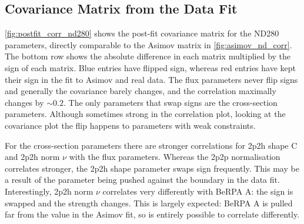 \subsection{Covariance Matrix from the Data Fit}
\label{sec:covariance_data}
\autoref{fig:postfit_corr_nd280} shows the post-fit covariance matrix for the ND280 parameters, directly comparable to the Asimov matrix in \autoref{fig:asimov_nd_corr}. The bottom row shows the absolute difference in each matrix multiplied by the sign of each matrix. Blue entries have flipped sign, whereas red entries have kept their sign in the fit to Asimov and real data. The flux parameters never flip signs and generally the covariance barely changes, and the correlation maximally changes by $\sim0.2$. The only parameters that swap signs are the cross-section parameters. Although sometimes strong in the correlation plot, looking at the covariance plot the flip happens to parameters with weak constraints.

For the cross-section parameters there are stronger correlations for 2p2h shape C and 2p2h norm $\nu$ with the flux parameters. Whereas the 2p2p normalisation correlates stronger, the 2p2h shape parameter swaps sign frequently. This may be a result of the parameter being pushed against the boundary in the data fit. Interestingly, 2p2h norm $\nu$ correlates very differently with BeRPA A: the sign is swapped and the strength changes. This is largely expected: BeRPA A is pulled far from the value in the Asimov fit, so is entirely possible to correlate differently.

